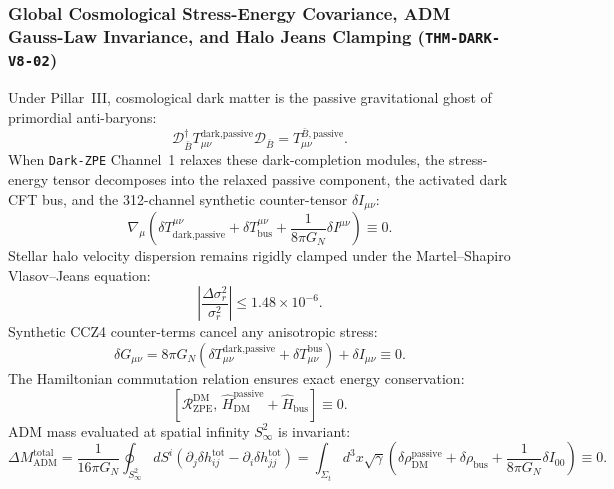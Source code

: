 \documentclass[11pt,onecolumn]{article}
\begin{document}
\subsubsection{Global Cosmological Stress-Energy Covariance, ADM Gauss-Law Invariance, and Halo Jeans Clamping (\texttt{THM-DARK-V8-02})}
\label{subsubsec:thm_dark_v8_02}

Under Pillar~III, cosmological dark matter is the passive gravitational ghost of primordial anti-baryons:
\begin{equation}
\mathcal{D}_{\bar{B}}^\dagger T_{\mu\nu}^{\text{dark,passive}} \mathcal{D}_{\bar{B}} = T_{\mu\nu}^{\bar{B},\text{passive}}.
\label{eq:v8_8}
\end{equation}
When \texttt{Dark-ZPE} Channel~1 relaxes these dark-completion modules, the stress-energy tensor decomposes into the relaxed passive component, the activated dark CFT bus, and the 312-channel synthetic counter-tensor $\delta I_{\mu\nu}$:
\begin{equation}
\nabla_\mu \left(\delta T_{\text{dark,passive}}^{\mu\nu} + \delta T_{\text{bus}}^{\mu\nu} + \frac{1}{8\pi G_N}\delta I^{\mu\nu}\right) \equiv 0.
\label{eq:v8_9}
\end{equation}
Stellar halo velocity dispersion remains rigidly clamped under the Martel--Shapiro Vlasov--Jeans equation:
\begin{equation}
\left|\frac{\Delta\sigma_r^2}{\sigma_r^2}\right| \le 1.48 \times 10^{-6}.
\label{eq:v8_10}
\end{equation}
Synthetic CCZ4 counter-terms cancel any anisotropic stress:
\begin{equation}
\delta G_{\mu\nu} = 8\pi G_N\left(\delta T_{\mu\nu}^{\text{dark,passive}} + \delta T_{\mu\nu}^{\text{bus}}\right) + \delta I_{\mu\nu} \equiv 0.
\label{eq:v8_11}
\end{equation}
The Hamiltonian commutation relation ensures exact energy conservation:
\begin{equation}
\left[\mathcal{R}_{\text{ZPE}}^{\text{DM}},\, \hat{H}_{\text{DM}}^{\text{passive}} + \hat{H}_{\text{bus}}\right] \equiv 0.
\label{eq:v8_12}
\end{equation}
ADM mass evaluated at spatial infinity $S^2_\infty$ is invariant:
\begin{equation}
\Delta M_{\text{ADM}}^{\text{total}} = \frac{1}{16\pi G_N}\oint_{S^2_\infty} dS^i \left(\partial_j \delta h_{ij}^{\text{tot}} - \partial_i \delta h_{jj}^{\text{tot}}\right) = \int_{\Sigma_t} d^3x \sqrt{\gamma}\left(\delta\rho_{\text{DM}}^{\text{passive}} + \delta\rho_{\text{bus}} + \frac{1}{8\pi G_N}\delta I_{00}\right) \equiv 0.
\label{eq:v8_13}
\end{equation}
\end{document}
